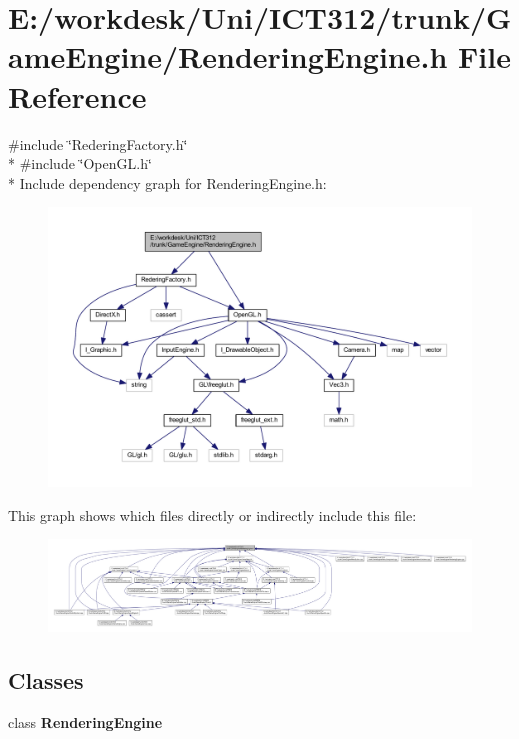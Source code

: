 \section{E\+:/workdesk/\+Uni/\+I\+C\+T312/trunk/\+Game\+Engine/\+Rendering\+Engine.h File Reference}
\label{_rendering_engine_8h}
{\ttfamily \#include \char`\"{}Redering\+Factory.\+h\char`\"{}}\\*
{\ttfamily \#include \char`\"{}Open\+G\+L.\+h\char`\"{}}\\*
Include dependency graph for Rendering\+Engine.\+h\+:\nopagebreak
\begin{figure}[H]
\begin{center}
\leavevmode
\includegraphics[width=350pt]{df/dd4/_rendering_engine_8h__incl}
\end{center}
\end{figure}
This graph shows which files directly or indirectly include this file\+:
\nopagebreak
\begin{figure}[H]
\begin{center}
\leavevmode
\includegraphics[width=350pt]{df/d82/_rendering_engine_8h__dep__incl}
\end{center}
\end{figure}
\subsection*{Classes}
\begin{DoxyCompactItemize}
\item 
class {\bf Rendering\+Engine}
\end{DoxyCompactItemize}
